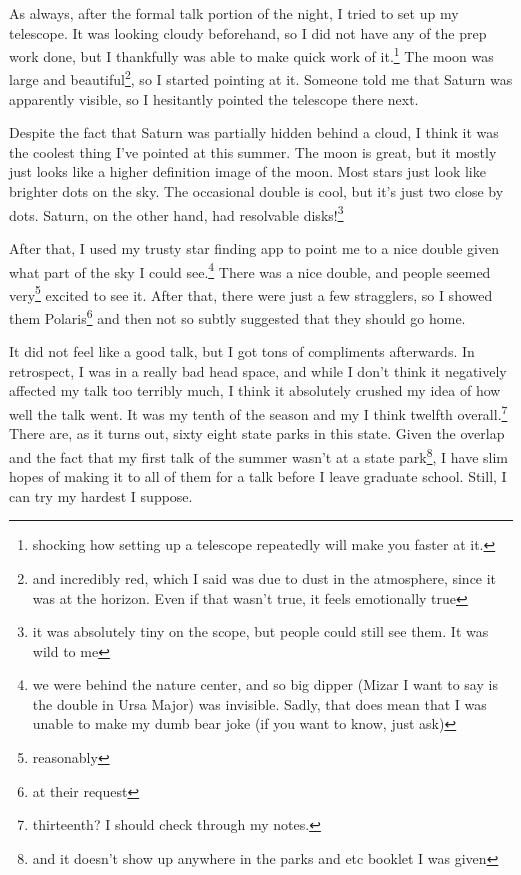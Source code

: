 \documentclass[12pt]{article}[titlepage]
\newcommand{\1}{\={a}}
\newcommand{\2}{\={e}}
\newcommand{\3}{\={\i}}
\newcommand{\4}{\=o}
\newcommand{\5}{\=u}
\newcommand{\6}{\={A}}
\renewcommand{\,}{\textsuperscript{,}}
\begin{document}
As always, after the formal talk portion of the night, I tried to set up my telescope.
It was looking cloudy beforehand, so I did not have any of the prep work done, but I thankfully was able to make quick work of it.\footnote{shocking how setting up a telescope repeatedly will make you faster at it.}
The moon was large and beautiful\footnote{and incredibly red, which I said was due to dust in the atmosphere, since it was at the horizon.
Even if that wasn't true, it feels emotionally true}, so I started pointing at it.
Someone told me that Saturn was apparently visible, so I hesitantly pointed the telescope there next.

Despite the fact that Saturn was partially hidden behind a cloud, I think it was the coolest thing I've pointed at this summer.
The moon is great, but it mostly just looks like a higher definition image of the moon.
Most stars just look like brighter dots on the sky.
The occasional double is cool, but it's just two close by dots.
Saturn, on the other hand, had resolvable disks!\footnote{it was absolutely tiny on the scope, but people could still see them.
It was wild to me}

After that, I used my trusty star finding app to point me to a nice double given what part of the sky I could see.\footnote{we were behind the nature center, and so big dipper (Mizar I want to say is the double in Ursa Major) was invisible. Sadly, that does mean that I was unable to make my dumb bear joke (if you want to know, just ask)}
There was a nice double, and people seemed very\footnote{reasonably} excited to see it.
After that, there were just a few stragglers, so I showed them Polaris\footnote{at their request} and then not so subtly suggested that they should go home.

It did not feel like a good talk, but I got tons of compliments afterwards.
In retrospect, I was in a really bad head space, and while I don't think it negatively affected my talk too terribly much, I think it absolutely crushed my idea of how well the talk went.
It was my tenth of the season and my I think twelfth overall.\footnote{thirteenth? I should check through my notes.}
There are, as it turns out, sixty eight state parks in this state.
Given the overlap and the fact that my first talk of the summer wasn't at a state park\footnote{and it doesn't show up anywhere in the parks and etc booklet I was given}, I have slim hopes of making it to all of them for a talk before I leave graduate school.
Still, I can try my hardest I suppose.
\end{document}
